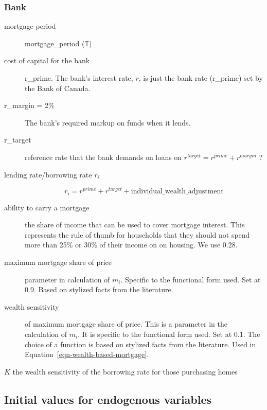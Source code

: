 \subsubsection{Bank} %
\begin{description}
\item [mortgage period]  mortgage\_period ($\mathbb{T}$)
\item [cost of capital for the bank] r\_prime. The bank's interest rate, $r$, is just the bank rate (r\_prime) set by the Bank of Canada.  

\item [r\_margin = 2\%] The bank's required markup on funds when it lends.  

\item [r\_target] reference rate that the bank demands on loans on 
$ r^{target}= r^{prime} +r^{margin}$ ? 

\item[lending rate/borrowing rate $r_i$]  
\[r_i=r^{prime} + r^{target} + \mathrm{individual\_wealth\_adjustment}\]

\item [{ability to carry a mortgage}] the share of income that can be used to cover mortgage interest. This represents the rule of thumb for households that they should not spend more than 25\% or 30\% of their income on on housing. We use 0.28.

\item [\gls{maximum mortgage share} of price] parameter in calculation of $m_i$. Specific to the functional form used. Set at 0.9. Based on stylized facts from the literature.  %
\item[wealth sensitivity] of maximum mortgage share of price. This is a parameter in the calculation of $m_i$. It is specific to the functional form used. Set at 0.1. The choice of a function is based on stylized facts from the literature.  %
Used in Equation~\ref{eqn-wealth-based-mortgage}.

\item [$K$ the wealth sensitivity of the borrowing rate for those purchasing homes]
\end{description}




\subsection{Initial values for endogenous variables} \label{sec-init-value-list}




